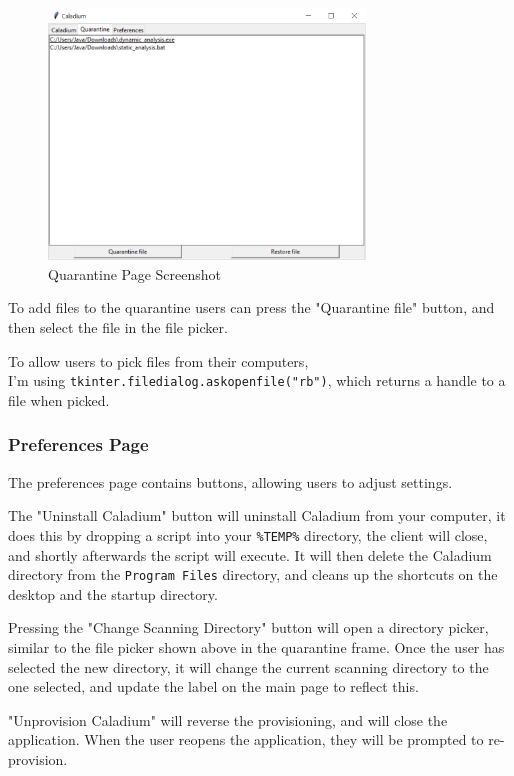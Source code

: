 \begin{figure}[h!]
    \centering
    \label{image:quarantinePageScreenshot}
    \includegraphics[width=0.75\textwidth]{../docs/client.png}
    \caption{Quarantine Page Screenshot}
\end{figure}

To add files to the quarantine users can press the "Quarantine file" button,
and then select the file in the file picker.

To allow users to pick files from their computers, \\
I'm using \texttt{tkinter.filedialog.askopenfile("rb")},
which returns a handle to a file when picked.

\subsubsection{Preferences Page}
The preferences page contains buttons,
allowing users to adjust settings.

The "Uninstall Caladium" button will uninstall Caladium from your computer,
it does this by dropping a script into your \texttt{\%TEMP\%} directory,
the client will close, and shortly afterwards the script will execute.
It will then delete the Caladium directory from the \texttt{Program Files} directory,
and cleans up the shortcuts on the desktop and the startup directory.

Pressing the "Change Scanning Directory" button will open a directory picker,
similar to the file picker shown above in the quarantine frame.
Once the user has selected the new directory,
it will change the current scanning directory to the one selected,
and update the label on the main page to reflect this.

"Unprovision Caladium" will reverse the provisioning,
and will close the application. When the user reopens
the application, they will be prompted to re-provision.


